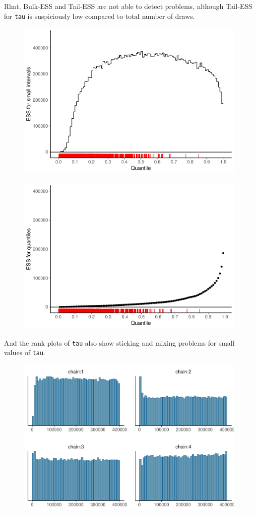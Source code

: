 \documentclass[american,]{article}
\begin{document}
Rhat, Bulk-ESS and Tail-ESS are not able to detect problems, although
Tail-ESS for \texttt{tau} is suspiciously low compared to total number
of draws.

\begin{figure}[tp]
  \centering
  \includegraphics[width=0.6\linewidth]{graphics/local-ess-fit-cp3-tau-1.pdf}
\end{figure}

\begin{figure}[tp]
  \centering
  \includegraphics[width=0.6\linewidth]{graphics/quantile-ess-fit-cp3-tau-1.pdf}
\end{figure}

And the rank plots of \texttt{tau} also show sticking and mixing
problems for small values of \texttt{tau}.

\begin{figure}[tp]
  \centering
  \includegraphics[width=0.6\linewidth]{graphics/hist-fit-cp3-tau-1.pdf}
\end{figure}
\end{document}
